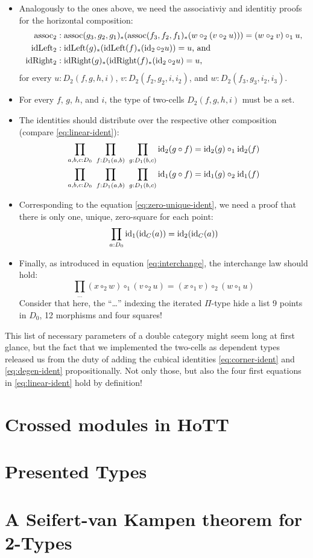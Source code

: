 \begin{defn}
\begin{itemize}
\item Analogously to the ones above, we need the associativiy and identitiy proofs
for the horizontal composition:
\begin{align*}
\assoch &: \assoc(g_3,g_2,g_1)_*(\assoc(f_3,f_2,f_1)_*(w \circ_2 (v \circ_2 u))) =
	(w \circ_2 v) \circ_1 u \text{,} \\ %
\idLefth &: \idLeft(g)_*(\idLeft(f)_*(\id_2 \circ_2 u)) = u \text{, and } \\
\idRighth &: \idRight(g)_*(\idRight(f)_*(\id_2 \circ_2 u) = u \text{,}
\end{align*}
for every $u : D_2(f,g,h,i)$, $v : D_2(f_2,g_2,i,i_2)$, and $w : D_2(f_3,g_3,i_2,i_3)$.
\item For every $f$, $g$, $h$, and $i$, the type of two-cells $D_2(f,g,h,i)$ must
be a set.
\item The identities should distribute over the respective other composition
(compare \ref{eq:linear-ident}):
\begin{align*}
\prod_{a,b,c : D_0} ~ \prod_{f : D_1(a,b)} ~ \prod_{g : D_1(b,c)}
	\operatorname{id}_2 (g \circ f) = \operatorname{id}_2(g) \circ_1 \operatorname{id}_2(f) \\
\prod_{a,b,c : D_0} ~ \prod_{f : D_1(a,b)} ~ \prod_{g : D_1(b,c)}
	\operatorname{id}_1 (g \circ f) = \operatorname{id}_1(g) \circ_2 \operatorname{id}_1(f)
\end{align*}
\item Corresponding to the equation \ref{eq:zero-unique-ident}, we need a proof
that there is only one, unique, zero-square for each point:
\begin{equation*}
\prod_{a : D_0} \operatorname{id}_1(\operatorname{id}_C(a)) = \operatorname{id}_2(\operatorname{id}_C(a))
\end{equation*}
\item Finally, as introduced in equation \ref{eq:interchange}, the interchange
law should hold:
\begin{equation*}
\prod_{\ldots} (x \circ_2 w) \circ_1 (v \circ_2 u) = (x \circ_1 v) \circ_2 (w \circ_1 u)
\end{equation*}
Consider that here, the ``\ldots'' indexing the iterated $\Pi$-type hide a list
9 points in $D_0$, 12 morphisms and four squares!
\end{itemize}
\end{defn}

This list of necessary parameters of a double category might seem long at first
glance, but the fact that we implemented the two-cells as dependent types
released us from the duty of adding the cubical identities \ref{eq:corner-ident}
and \ref{eq:degen-ident} propositionally. Not only those, but also the four
first equations in \ref{eq:linear-ident} hold by definition!

\section{Crossed modules in HoTT}

\section{Presented Types}

\section{A Seifert-van Kampen theorem for 2-Types}

